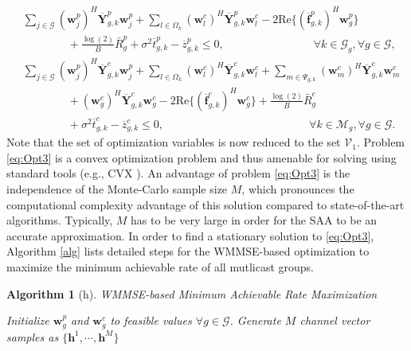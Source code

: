 \documentclass[12pt,draftcls,onecolumn]{IEEEtran}
\newtheorem{algorithm}{Algorithm}
\theoremstyle{remark}
\theoremstyle{definition}
\begin{document}
{\begin{subequations}
\begin{align}
		& \sum_{j\in\mathcal{G}} (\mathbf{w}_j^p)^H \overline{\mathbf{Y}}_{g,k}^p \mathbf{w}_j^p + \sum_{l\in\Omega_k} (\mathbf{w}_l^c)^H \overline{\mathbf{Y}}_{g,k}^p \mathbf{w}_l^c - 2 \text{Re}\{ (\overline{\mathbf{f}}_{g,k}^p)^H \mathbf{w}_g^p \} \nonumber\\ 
		& \qquad \qquad + \frac{\log(2)}{B} \bar{R}_{g}^{p} + \sigma^2 \overline{t}_{g,k}^p - \overline{z}_{g,k}^p \leq 0, \qquad\qquad\qquad\qquad \forall k \in \mathcal{G}_g, \forall g \in \mathcal{G}, \\	
		& \sum_{j\in\mathcal{G}} (\mathbf{w}_j^p)^H \overline{\mathbf{Y}}_{g,k}^c \mathbf{w}_j^p + \sum_{l\in\Omega_k} (\mathbf{w}_l^c)^H \overline{\mathbf{Y}}_{g,k}^c \mathbf{w}_l^c + \sum_{m\in\Psi_{g,k}} (\mathbf{w}_m^c)^H \overline{\mathbf{Y}}_{g,k}^c \mathbf{w}_m^c \nonumber\\ 
		& \qquad \qquad  + (\mathbf{w}_g^c)^H \overline{\mathbf{Y}}_{g,k}^c \mathbf{w}_g^c - 2 \text{Re}\{ (\overline{\mathbf{f}}_{g,k}^c)^H \mathbf{w}_g^c \} + \frac{\log(2)}{B} \bar{R}_{g}^{c} \nonumber \\
		& \qquad \qquad + \sigma^2 \overline{t}_{g,k}^c - \overline{z}_{g,k}^c \leq 0, \qquad\qquad\qquad\qquad\qquad\qquad\quad \forall k \in \mathcal{M}_g, \forall g \in \mathcal{G}. 
	\end{align}
\end{subequations}  
Note that the set of optimization variables is now reduced to the set $\mathcal{V}_1$. Problem \eqref{eq:Opt3} is a convex optimization problem and thus amenable for solving using standard tools (e.g., CVX \cite{cvx}). %
An advantage of problem \eqref{eq:Opt3} is the independence of the Monte-Carlo sample size $M$, which pronounces the computational complexity advantage of this solution compared to state-of-the-art algorithms. Typically, $M$ has to be very large in order for the SAA to be an accurate approximation. In order to find a stationary solution to \eqref{eq:Opt3}, Algorithm \ref{alg} lists detailed steps for the WMMSE-based optimization to maximize the minimum achievable rate of all mutlicast groups.
\begin{algorithm}[h]
	\caption{WMMSE-based Minimum Achievable Rate Maximization}
	\begin{spacing}{1.1}
	\begin{algorithmic}[1]
		\STATE Initialize $\mathbf{w}_g^p$ and $\mathbf{w}_g^c$ to feasible values $\forall g\in\mathcal{G}$. Generate $M$ channel vector samples as $\{\mathbf{h}^1,\cdots,\mathbf{h}^M\}$

\end{algorithmic}
\end{spacing}
\end{algorithm}}
\end{document}
